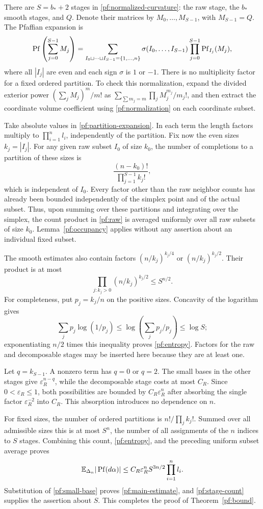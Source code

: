 There are $S=b_*+2$ stages in \eqref{pf:normalized-curvature}:
the raw stage, the $b_*$ smooth stages, and $Q$.  Denote their matrices
by $M_0,\ldots,M_{S-1}$, with $M_{S-1}=Q$.  The Pfaffian expansion is
\begin{equation}
 \operatorname{Pf}\left(\sum_{j=0}^{S-1}M_j\right)
 =\sum_{I_0\sqcup\cdots\sqcup I_{S-1}=\{1,\ldots,n\}}
       \sigma(I_0,\ldots,I_{S-1})
       \prod_{j=0}^{S-1}\operatorname{Pf}_{I_j}(M_j),
 \label{pf:partition-expansion}
\end{equation}
where all $|I_j|$ are even and each sign $\sigma$ is $1$ or $-1$.
There is no multiplicity factor for a fixed ordered partition.  To
check this normalization, expand the divided exterior power
$(\sum_jM_j)^m/m!$ as
$\sum_{\sum m_j=m}\prod_j M_j^{m_j}/m_j!$, and then extract the
coordinate volume coefficient using \eqref{pf:normalization} on
each coordinate subset.

Take absolute values in \eqref{pf:partition-expansion}.  In each
term the length factors multiply to $\prod_{i=1}^nl_i$, independently
of the partition.  Fix now the even sizes $k_j=|I_j|$.  For any given
raw subset $I_0$ of size $k_0$, the number of completions to a partition
of these sizes is
\[
 \frac{(n-k_0)!}{\prod_{j=1}^{S-1}k_j!},
\]
which is independent of $I_0$.  Every factor other than the raw
neighbor counts has already been bounded independently of the
simplex point and of the actual subset.  Thus, upon summing over
these partitions and integrating over the simplex, the count product
in \eqref{pf:raw} is averaged uniformly over all raw subsets of
size $k_0$.  Lemma~\ref{pf:occupancy} applies without any assertion
about an individual fixed subset.

The smooth estimates also contain factors
$(n/k_j)^{k_j/4}$ or $(n/k_j)^{k_j/2}$.  Their product is at most
\begin{equation}
 \prod_{j:k_j>0}(n/k_j)^{k_j/2}\le S^{n/2}.
 \label{pf:entropy}
\end{equation}
For completeness, put $p_j=k_j/n$ on the positive sizes.  Concavity
of the logarithm gives
\[
 \sum_jp_j\log(1/p_j)
 \le\log\left(\sum_jp_j/p_j\right)\le\log S;
\]
exponentiating $n/2$ times this inequality proves
\eqref{pf:entropy}.  Factors for the raw and decomposable stages may
be inserted here because they are at least one.

Let $q=k_{S-1}$.  A nonzero term has $q=0$ or $q=2$.  The small bases
in the other stages give $\varepsilon_R^{n-q}$, while the
decomposable stage costs at most $C_R$.  Since
$0<\varepsilon_R\le1$, both possibilities are bounded by
$C_R\varepsilon_R^n$ after absorbing the single factor
$\varepsilon_R^{-2}$ into $C_R$.  This absorption introduces no
dependence on $n$.

For fixed sizes, the number of ordered partitions is
$n!/\prod_j k_j!$.  Summed over all admissible sizes this is at most
$S^n$, the number of all assignments of the $n$ indices to $S$
stages.  Combining this count, \eqref{pf:entropy}, and the preceding
uniform subset average proves
\[
 \mathbb E_{\Delta_n}|\operatorname{Pf}(d\alpha)|
 \le C_R\varepsilon_R^n S^{3n/2}\prod_{i=1}^n l_i.
\]
Substitution of \eqref{pf:small-base} proves
\eqref{pf:main-estimate}, and \eqref{pf:stage-count} supplies the
assertion about $S$.  This completes the proof of
Theorem~\ref{pf:bound}.
